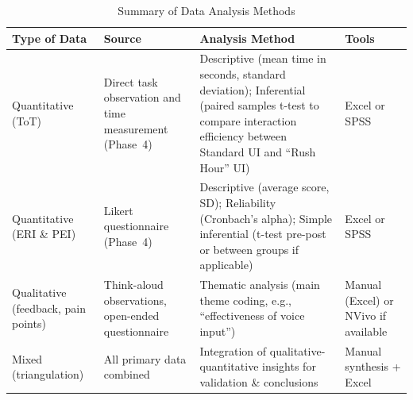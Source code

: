 \begin{table}[htbp]
    \centering
    \small
    \setlength{\tabcolsep}{4pt}
    \renewcommand{\arraystretch}{1.15}
    \caption{Summary of Data Analysis Methods}
    \label{tab:analysis}
    \begin{tabular}{>{\raggedright\arraybackslash}p{} >{\raggedright\arraybackslash}p{} >{\raggedright\arraybackslash}p{} >{\raggedright\arraybackslash}p{}}
    \hline
    \textbf{Type of Data} & \textbf{Source} & \textbf{Analysis Method} & \textbf{Tools} \\
    \hline \hline
    Quantitative (ToT) & Direct task observation and time measurement (Phase~4) & Descriptive (mean time in seconds, standard deviation); Inferential (paired samples t-test to compare interaction efficiency between Standard UI and ``Rush Hour'' UI) & Excel or SPSS \\
    \hline
    Quantitative (ERI \& PEI) & Likert questionnaire (Phase~4) & Descriptive (average score, SD); Reliability (Cronbach's alpha); Simple inferential (t-test pre-post or between groups if applicable) & Excel or SPSS \\
    \hline
    Qualitative (feedback, pain points) & Think-aloud observations, open-ended questionnaire & Thematic analysis (main theme coding, e.g., ``effectiveness of voice input'') & Manual (Excel) or NVivo if available \\
    \hline
    Mixed (triangulation) & All primary data combined & Integration of qualitative-quantitative insights for validation \& conclusions & Manual synthesis + Excel \\
    \hline
    \end{tabular}
\end{table}
